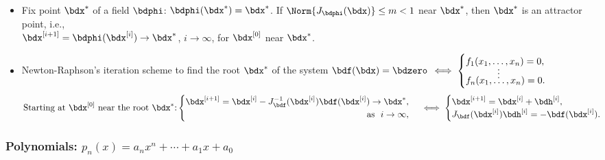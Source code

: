 \documentclass[a4paper]{article}
\begin{document}
\begin{itemize}

  \item Fix point $\bdx^*$
    of a field $\bdphi$:
    $\bdphi(\bdx^*)=\bdx^*$.
    If
    $
      \Norm {J_{\bdphi}(\bdx)} \le m < 1
    $
    near $\bdx^*$,
    then $\bdx^*$ is an attractor point, i.e., \\
    $\bdx^{[i+1]}=\bdphi(\bdx^{[i]})\to\bdx^*$, $i\to\infty$, for
    $\bdx^{[0]}$ near $\bdx^*$.

  \item Newton-Raphson's iteration scheme to find the root $\bdx^*$ of
    the system \/
        $
          \bdf(\bdx) = \bdzero
          \,\iff
          \begin{cases}
            f_1(x_1,\ldots,x_n) = 0, \\[-5pt]
            \hspace{3.3em}\vdots \\[-9pt]
            f_n(x_1,\ldots,x_n) = 0. \\
          \end{cases}
        $
        \[
        \text{Starting at $\bdx^{[0]}$ near the root $\bdx^*$:}
        \begin{cases}
          \bdx^{[i+1]}
          =
          \bdx^{[i]}
          -
          J_{\bdf}^{-1}(\bdx^{[i]})\bdf(\bdx^{[i]}) \to \bdx^*, \\
        \hfill\text{as }~i\to\infty,
        \end{cases}
        \iff
          \begin{cases}
            \bdx^{[i+1]}
            =
            \bdx^{[i]}+\bdh^{[i]}, \\ %
            J_{\bdf}(\bdx^{[i]})\bdh^{[i]}=-\bdf(\bdx^{[i]}).
          \end{cases}
        \]
\end{itemize}

\subsubsection*{Polynomials: $p_n(x) = a_nx^n+\cdots+a_1x+a_0$}%
\end{document}
